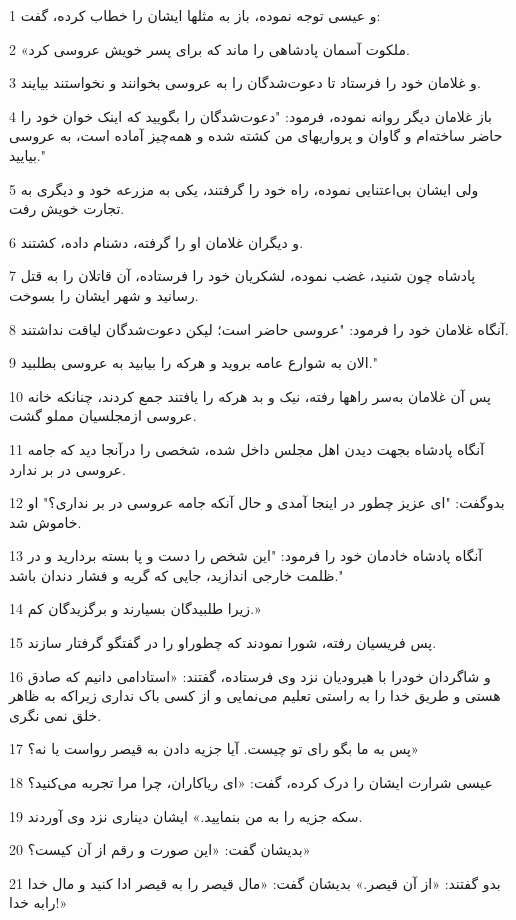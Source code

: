 \par 1 و عیسی توجه نموده، باز به مثلها ایشان را خطاب کرده، گفت:
\par 2 «ملکوت آسمان پادشاهی را ماند که برای پسر خویش عروسی کرد.
\par 3 و غلامان خود را فرستاد تا دعوت‌شدگان را به عروسی بخوانند و نخواستند بیایند.
\par 4 باز غلامان دیگر روانه نموده، فرمود: "دعوت‌شدگان را بگویید که اینک خوان خود را حاضر ساخته‌ام و گاوان و پرواریهای من کشته شده و همه‌چیز آماده است، به عروسی بیایید."
\par 5 ولی ایشان بی‌اعتنایی نموده، راه خود را گرفتند، یکی به مزرعه خود و دیگری به تجارت خویش رفت.
\par 6 و دیگران غلامان او را گرفته، دشنام داده، کشتند.
\par 7 پادشاه چون شنید، غضب نموده، لشکریان خود را فرستاده، آن قاتلان را به قتل رسانید و شهر ایشان را بسوخت.
\par 8 آنگاه غلامان خود را فرمود: "عروسی حاضر است؛ لیکن دعوت‌شدگان لیاقت نداشتند.
\par 9 الان به شوارع عامه بروید و هر‌که را بیابید به عروسی بطلبید."
\par 10 پس آن غلامان به‌سر راهها رفته، نیک و بد هرکه را یافتند جمع کردند، چنانکه خانه عروسی ازمجلسیان مملو گشت.
\par 11 آنگاه پادشاه بجهت دیدن اهل مجلس داخل شده، شخصی را درآنجا دید که جامه عروسی در بر ندارد.
\par 12 بدوگفت: "ای عزیز چطور در اینجا آمدی و حال آنکه جامه عروسی در بر نداری؟" او خاموش شد.
\par 13 آنگاه پادشاه خادمان خود را فرمود: "این شخص را دست و پا بسته بردارید و در ظلمت خارجی اندازید، جایی که گریه و فشار دندان باشد."
\par 14 زیرا طلبیدگان بسیارند و برگزیدگان کم.»
\par 15 پس فریسیان رفته، شورا نمودند که چطوراو را در گفتگو گرفتار سازند.
\par 16 و شاگردان خودرا با هیرودیان نزد وی فرستاده، گفتند: «استادامی دانیم که صادق هستی و طریق خدا را به راستی تعلیم می‌نمایی و از کسی باک نداری زیراکه به ظاهر خلق نمی نگری.
\par 17 پس به ما بگو رای تو چیست. آیا جزیه دادن به قیصر رواست یا نه؟»
\par 18 عیسی شرارت ایشان را درک کرده، گفت: «ای ریاکاران، چرا مرا تجربه می‌کنید؟
\par 19 سکه جزیه را به من بنمایید.» ایشان دیناری نزد وی آوردند.
\par 20 بدیشان گفت: «این صورت و رقم از آن کیست؟»
\par 21 بدو گفتند: «از آن قیصر.» بدیشان گفت: «مال قیصر را به قیصر ادا کنید و مال خدا رابه خدا!»
